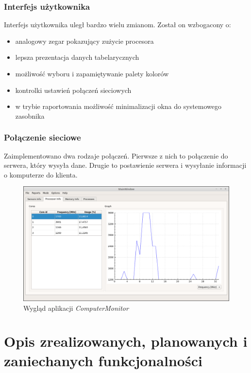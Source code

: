 \documentclass[a4paper]{article}
\begin{document}
\subsubsection{Interfejs użytkownika}
Interfejs użytkownika uległ bardzo wielu zmianom. Został on wzbogacony o:
\begin{itemize}
	\item analogowy zegar pokazujący zużycie procesora
	\item lepsza prezentacja danych tabelarycznych
	\item możliwość wyboru i zapamiętywanie palety kolorów
	\item kontrolki ustawień połączeń sieciowych
	\item w trybie raportowania możliwość minimalizacji okna do systemowego zasobnika
\end{itemize}

\subsubsection{Połączenie sieciowe}
Zaimplementowano dwa rodzaje połączeń. Pierwsze z nich to połączenie do serwera, który wysyła dane. Drugie to postawienie serwera i wysyłanie informacji o komputerze do klienta.


\begin{figure}[h]
	\centering
	\includegraphics[width=\linewidth]{img/wygladAplikacji.png}
	\caption{Wygląd aplikacji \textit{ComputerMonitor}}
	\label{wygladAplikacji}
\end{figure}




\section{Opis zrealizowanych, planowanych i zaniechanych funkcjonalności}
\end{document}
